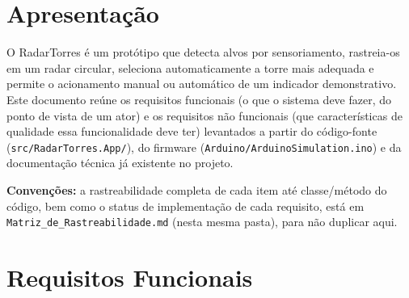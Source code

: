 
\section{Apresentação}

O RadarTorres é um protótipo que detecta alvos por sensoriamento, rastreia-os em um radar
circular, seleciona automaticamente a torre mais adequada e permite o acionamento manual ou
automático de um indicador demonstrativo. Este documento reúne os requisitos funcionais (o que o
sistema deve fazer, do ponto de vista de um ator) e os requisitos não funcionais (que
características de qualidade essa funcionalidade deve ter) levantados a partir do código-fonte
(\texttt{src/RadarTorres.App/}), do firmware (\texttt{Arduino/ArduinoSimulation.ino}) e da
documentação técnica já existente no projeto.

\textbf{Convenções:} a rastreabilidade completa de cada item até classe/método do código, bem
como o status de implementação de cada requisito, está em \texttt{Matriz\_de\_Rastreabilidade.md}
(nesta mesma pasta), para não duplicar aqui.

\section{Requisitos Funcionais}

